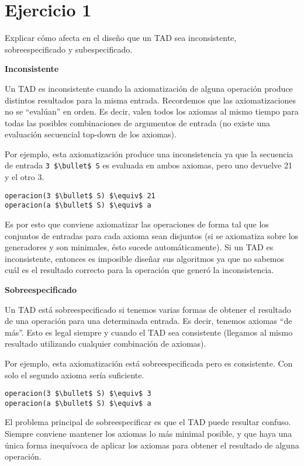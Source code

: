 \section{Ejercicio 1}

Explicar cómo afecta en el diseño que un TAD sea inconsistente, sobreespecificado y subespecificado.

\textbf{Inconsistente}

Un TAD es inconsistente cuando la axiomatización de alguna operación produce distintos resultados para la misma entrada. Recordemos que las axiomatizaciones no se ``evalúan'' en orden. Es decir, valen todos los axiomas al mismo tiempo para todas las posibles combinaciones de argumentos de entrada (no existe una evaluación secuencial top-down de los axiomas).

Por ejemplo, esta axiomatización produce una inconsistencia ya que la secuencia de entrada \lstinline{3 $\bullet$ S} es evaluada en ambos axiomas, pero uno devuelve 21 y el otro 3.

\begin{lstlisting}
operacion(3 $\bullet$ S) $\equiv$ 21
operacion(a $\bullet$ S) $\equiv$ a
\end{lstlisting}

Es por esto que conviene axiomatizar las operaciones de forma tal que los conjuntos de entradas para cada axioma sean disjuntos (si se axiomatiza sobre los generadores y son minimales, ésto sucede automáticamente). Si un TAD es inconsistente, entonces es imposible diseñar sus algoritmos ya que no sabemos cuál es el resultado correcto para la operación que generó la inconsistencia.

\textbf{Sobreespecificado}

Un TAD está sobreespecificado si tenemos varias formas de obtener el resultado de una operación para una determinada entrada. Es decir, tenemos axiomas ``de más''. Esto es legal siempre y cuando el TAD sea consistente (llegamos al mismo resultado utilizando cualquier combinación de axiomas).

Por ejemplo, esta axiomatización está sobreespecificada pero es consistente. Con solo el segundo axioma sería suficiente.

\begin{lstlisting}
operacion(3 $\bullet$ S) $\equiv$ 3
operacion(a $\bullet$ S) $\equiv$ a
\end{lstlisting}

El problema principal de sobreespecificar es que el TAD puede resultar confuso. Siempre conviene mantener los axiomas lo más minimal posible, y que haya una única forma inequívoca de aplicar los axiomas para obtener el resultado de alguna operación.

